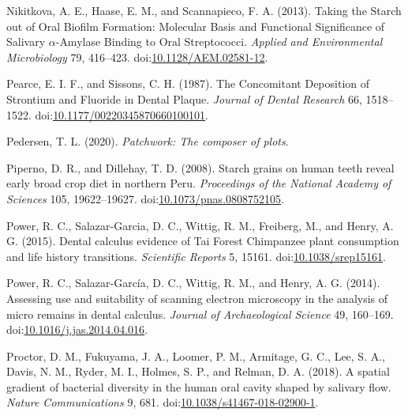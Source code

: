 \documentclass[utf8]{frontiers/frontiersSCNS}
\newlength{\cslhangindent}
\newlength{\cslentryspacingunit} %
\newenvironment{CSLReferences}[2] %
 {%
  \setlength{\parindent}{0pt}
  \ifodd #1
  \let\oldpar\par
  \def\par{\hangindent=\cslhangindent\oldpar}
  \fi
  \setlength{\parskip}{#2\cslentryspacingunit}
 }%
 {}
\begin{document}
\begin{CSLReferences}{1}{0}
\leavevmode{}%
Nikitkova, A. E., Haase, E. M., and Scannapieco, F. A. (2013). Taking the {Starch} out of {Oral Biofilm Formation}: {Molecular Basis} and {Functional Significance} of {Salivary} {\(\alpha\)}-{Amylase Binding} to {Oral Streptococci}. \emph{Applied and Environmental Microbiology} 79, 416--423. doi:\href{https://doi.org/10.1128/AEM.02581-12}{10.1128/AEM.02581-12}.

\leavevmode{}%
Pearce, E. I. F., and Sissons, C. H. (1987). The {Concomitant Deposition} of {Strontium} and {Fluoride} in {Dental Plaque}. \emph{Journal of Dental Research} 66, 1518--1522. doi:\href{https://doi.org/10.1177/00220345870660100101}{10.1177/00220345870660100101}.

\leavevmode{}%
Pedersen, T. L. (2020). \emph{Patchwork: {The} composer of plots}.

\leavevmode{}%
Piperno, D. R., and Dillehay, T. D. (2008). Starch grains on human teeth reveal early broad crop diet in northern {Peru}. \emph{Proceedings of the National Academy of Sciences} 105, 19622--19627. doi:\href{https://doi.org/10.1073/pnas.0808752105}{10.1073/pnas.0808752105}.

\leavevmode{}%
Power, R. C., Salazar-Garcia, D. C., Wittig, R. M., Freiberg, M., and Henry, A. G. (2015). Dental calculus evidence of {Tai Forest Chimpanzee} plant consumption and life history transitions. \emph{Scientific Reports} 5, 15161. doi:\href{https://doi.org/10.1038/srep15161}{10.1038/srep15161}.

\leavevmode{}%
Power, R. C., Salazar-García, D. C., Wittig, R. M., and Henry, A. G. (2014). Assessing use and suitability of scanning electron microscopy in the analysis of micro remains in dental calculus. \emph{Journal of Archaeological Science} 49, 160--169. doi:\href{https://doi.org/10.1016/j.jas.2014.04.016}{10.1016/j.jas.2014.04.016}.

\leavevmode{}%
Proctor, D. M., Fukuyama, J. A., Loomer, P. M., Armitage, G. C., Lee, S. A., Davis, N. M., Ryder, M. I., Holmes, S. P., and Relman, D. A. (2018). A spatial gradient of bacterial diversity in the human oral cavity shaped by salivary flow. \emph{Nature Communications} 9, 681. doi:\href{https://doi.org/10.1038/s41467-018-02900-1}{10.1038/s41467-018-02900-1}.


\end{CSLReferences}
\end{document}
